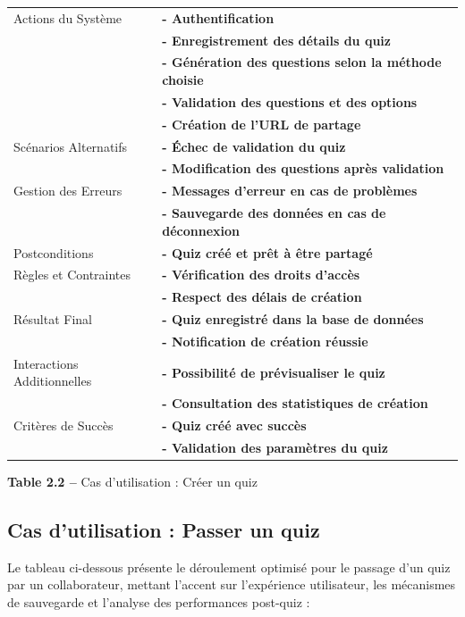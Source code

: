 \documentclass[12pt,a4paper]{report}
\begin{document}
\begin{longtable}[]{@{}
  >{\raggedright\arraybackslash}p{}
  >{\raggedright\arraybackslash}p{}@{}}
Actions du Système & \textbf{- Authentification} \\
& \textbf{- Enregistrement des détails du quiz} \\
& \textbf{- Génération des questions selon la méthode choisie} \\
& \textbf{- Validation des questions et des options} \\
& \textbf{- Création de l'URL de partage} \\
Scénarios Alternatifs & \textbf{- Échec de validation du quiz} \\
& \textbf{- Modification des questions après validation} \\
Gestion des Erreurs & \textbf{- Messages d'erreur en cas de problèmes} \\
& \textbf{- Sauvegarde des données en cas de déconnexion} \\
Postconditions & \textbf{- Quiz créé et prêt à être partagé} \\
Règles et Contraintes & \textbf{- Vérification des droits d'accès} \\
& \textbf{- Respect des délais de création} \\
Résultat Final & \textbf{- Quiz enregistré dans la base de données} \\
& \textbf{- Notification de création réussie} \\
Interactions Additionnelles & \textbf{- Possibilité de prévisualiser le quiz} \\
& \textbf{- Consultation des statistiques de création} \\
Critères de Succès & \textbf{- Quiz créé avec succès} \\
& \textbf{- Validation des paramètres du quiz} \\
\bottomrule()
\end{longtable}

\begin{center}
\textbf{Table 2.2 –} Cas d'utilisation : Créer un quiz
\end{center}

\subsection{Cas d'utilisation : Passer un quiz}

Le tableau ci-dessous présente le déroulement optimisé pour le passage d'un quiz par un collaborateur, mettant l'accent sur l'expérience utilisateur, les mécanismes de sauvegarde et l'analyse des performances post-quiz :
\end{document}
